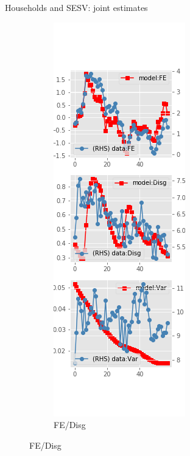 \documentclass{beamer}
\begin{document}
\begin{frame}{Households and SESV: joint estimates}
\begin{figure}[ht]
\begin{subfigure}[b]{0.2\textwidth}
		\end{subfigure}
		\hfill
		\begin{subfigure}[b]{0.2\textwidth}
			\caption{FE/Disg}
			\includegraphics[width=\textwidth, height = 0.8\textheight]{figuresDraft/sce_se_est_sv_joint_diag1.png}

\end{subfigure}
\end{figure}
\end{frame}
\end{document}
